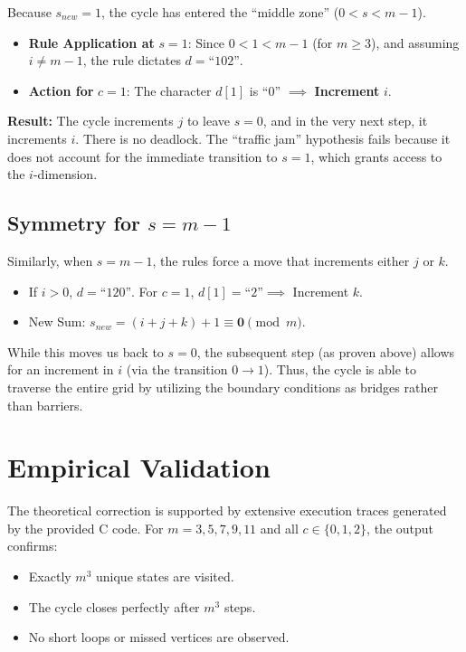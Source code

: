 \documentclass[10pt]{article}
\begin{document}
Because $s_{new} = 1$, the cycle has entered the ``middle zone'' ($0 < s < m-1$).
\begin{itemize}
    \item \textbf{Rule Application at } $s=1$: Since $0 < 1 < m-1$ (for $m \ge 3$), and assuming $i \neq m-1$, the rule dictates $d = \text{``102''}$.
    \item \textbf{Action for } $c=1$: The character $d[1]$ is ``0'' $\implies$ \textbf{Increment } $i$.
\end{itemize}

\textbf{Result:} The cycle increments $j$ to leave $s=0$, and in the very next step, it increments $i$. There is no deadlock. The ``traffic jam'' hypothesis fails because it does not account for the immediate transition to $s=1$, which grants access to the $i$-dimension.

\subsection{Symmetry for $s=m-1$}

Similarly, when $s=m-1$, the rules force a move that increments either $j$ or $k$.
\begin{itemize}
    \item If $i > 0$, $d = \text{``120''}$. For $c=1$, $d[1]=\text{``2''} \implies$ Increment $k$.
    \item New Sum: $s_{new} = (i+j+k)+1 \equiv \mathbf{0} \pmod m$.
\end{itemize}

While this moves us back to $s=0$, the subsequent step (as proven above) allows for an increment in $i$ (via the transition $0 \to 1$). Thus, the cycle is able to traverse the entire grid by utilizing the boundary conditions as bridges rather than barriers.

\section{Empirical Validation}

The theoretical correction is supported by extensive execution traces generated by the provided C code. For $m=3, 5, 7, 9, 11$ and all $c \in \{0, 1, 2\}$, the output confirms:
\begin{itemize}
    \item Exactly $m^3$ unique states are visited.
    \item The cycle closes perfectly after $m^3$ steps.
    \item No short loops or missed vertices are observed.
\end{itemize}
\end{document}

